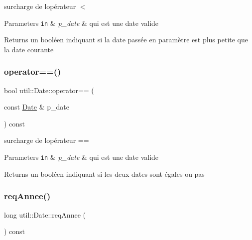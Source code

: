 surcharge de l\textquotesingle{}opérateur $<$ 


\begin{DoxyParams}[1]{Parameters}
\mbox{\tt in}  & {\em p\+\_\+date} & qui est une date valide \\
\hline
\end{DoxyParams}
\begin{DoxyReturn}{Returns}
un booléen indiquant si la date passée en paramètre est plus petite que la date courante 
\end{DoxyReturn}
\mbox{\label{classutil_1_1Date_a8114f8e40cee24e1d7a58b910e8f4637}} 
\subsubsection{\texorpdfstring{operator==()}{operator==()}}
{\footnotesize\ttfamily bool util\+::\+Date\+::operator== (\begin{DoxyParamCaption}\item[{const \hyperlink{classutil_1_1Date}{Date} \&}]{p\+\_\+date }\end{DoxyParamCaption}) const}



surcharge de l\textquotesingle{}opérateur == 


\begin{DoxyParams}[1]{Parameters}
\mbox{\tt in}  & {\em p\+\_\+date} & qui est une date valide \\
\hline
\end{DoxyParams}
\begin{DoxyReturn}{Returns}
un booléen indiquant si les deux dates sont égales ou pas 
\end{DoxyReturn}
\mbox{\label{classutil_1_1Date_aa7c4b428456da55a2e3769e93ad9bb8d}} 
\subsubsection{\texorpdfstring{req\+Annee()}{reqAnnee()}}
{\footnotesize\ttfamily long util\+::\+Date\+::req\+Annee (\begin{DoxyParamCaption}{ }\end{DoxyParamCaption}) const}



